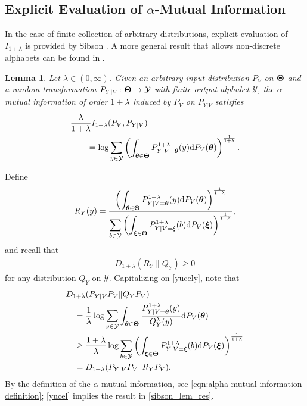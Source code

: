 \documentclass[journal, 10pt]{IEEEtran}
\def\ds{\displaystyle}
\newcommand{\rmd}{\mathrm{d}}
\newcommand{\cY}{\mathcal{Y}}
\theoremstyle{plain}
\theoremstyle{plain}
\newtheorem{lem}{Lemma}%
\theoremstyle{plain}
\theoremstyle{plain}
\newcommand{\boldtheta}{\mathbold{\theta}}
\newcommand{\boldxi}{\mathbold{\xi}}
\begin{document}
\begin{appendices}
\section{Explicit Evaluation of $\alpha$-Mutual Information}\label{appdx: Explicit alpha mutual info}

In the case of finite collection of arbitrary distributions, explicit evaluation of $I_{1+\lambda}$ is provided by Sibson \cite[Corollary 2.3]{sibson1969information}. A more general result that allows non-discrete alphabets can be found in \cite{Verdu2015}.
\begin{lem}\label{lem:explicit alpha mut info}
	Let $\lambda \in (0,\infty) $. Given an arbitrary input distribution $P_V$ on $\bold{\Theta}$ and a random transformation $P_{Y|V}\colon \bold{\Theta} \to \cY  $ with finite output alphabet $\cY$, the $\alpha$-mutual information of order $1+\lambda$ induced by $P_V$ on $P_{Y|V} $ satisfies
		\begin{align}
		&\frac{\lambda}{1+\lambda} I_{1+\lambda}(P_V,P_{Y|V}) \nonumber \\
		 &\qquad = \log \sum_{y\in \cY} \left(  \int_{\boldtheta \in \bold{\Theta}} P^{1+\lambda}_{Y|V=\boldtheta}(y)\rmd P_V(\boldtheta)\right)^{\frac1{1+\lambda}}\text{.} \label{sibson_lem_res}
	\end{align}
\end{lem}

\begin{IEEEproof}
Define 
\begin{align}
	R_Y(y)=\frac{\left( \ds \int_{\boldtheta\in \bold{\Theta}} P^{1+\lambda}_{Y|V=\boldtheta}(y)\rmd P_V(\boldtheta)  \right)^{\frac{1}{1+\lambda}} }{\ds \sum_{b\in \cY} \left( \int_{\boldxi \in \bold{\Theta }}P^{1+\lambda}_{Y|V=\boldxi}(b)\rmd P_V(\boldxi)  \right)^{\frac{1}{1+\lambda}} } \text{,}
\end{align}
and recall that 
\begin{align}
	D_{1+\lambda}(R_Y\|Q_Y)\ge 0 \label{yucely}
\end{align}
for any distribution $Q_Y$ on $\cY$. Capitalizing on \eqref{yucely}, note that 
\begin{align}
&D_{1+\lambda}(P_{Y|V}P_V \| Q_Y P_V) \nonumber \\
	&\quad =\frac{1}{\lambda} \log \sum_{y\in \cY}  \int_{\boldtheta \in\bold{\Theta} } \frac{P^{1+\lambda}_{Y|V=\boldtheta}(y)}{Q_Y^{\lambda}(y)} \rmd P_V(\boldtheta) \label{yucelz}
	\\ 
	&\quad \ge \frac{1+\lambda}{\lambda} \log \sum_{b\in \cY}\left(\int_{\boldxi \in \bold{\Theta} } P^{1+\lambda}_{Y|V=\boldxi}(b)\rmd P_{V}(\boldxi)\right)^{\frac{1}{1+\lambda}}  \\
	&\quad = D_{1+\lambda}(P_{Y|V}P_V \| R_Y P_V ) \label{yucel} \text{.}
\end{align}
By the definition of the $\alpha$-mutual information, see \eqref{eqn:alpha-mutual-information definition}; \eqref{yucel} implies the result in \eqref{sibson_lem_res}.
\end{IEEEproof}





\end{appendices}
\end{document}
